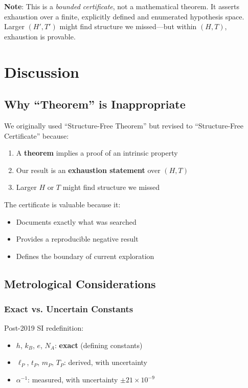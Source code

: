 \documentclass[twocolumn,showpacs,preprintnumbers,amsmath,amssymb,prl]{revtex4-2}
\begin{document}
\textbf{Note}: This is a \textit{bounded certificate}, not a mathematical theorem. It asserts exhaustion over a finite, explicitly defined and enumerated hypothesis space. Larger $(H', T')$ might find structure we missed---but within $(H, T)$, exhaustion is provable.

\section{Discussion}

\subsection{Why ``Theorem'' is Inappropriate}

We originally used ``Structure-Free Theorem'' but revised to ``Structure-Free Certificate'' because:

\begin{enumerate}
    \item A \textbf{theorem} implies a proof of an intrinsic property
    \item Our result is an \textbf{exhaustion statement} over $(H, T)$
    \item Larger $H$ or $T$ might find structure we missed
\end{enumerate}

The certificate is valuable because it:
\begin{itemize}
    \item Documents exactly what was searched
    \item Provides a reproducible negative result
    \item Defines the boundary of current exploration
\end{itemize}

\subsection{Metrological Considerations}

\subsubsection{Exact vs. Uncertain Constants}

Post-2019 SI redefinition:
\begin{itemize}
    \item $h$, $k_B$, $e$, $N_A$: \textbf{exact} (defining constants)
    \item $\ell_P$, $t_P$, $m_P$, $T_P$: derived, with uncertainty
    \item $\alpha^{-1}$: measured, with uncertainty $\pm 21 \times 10^{-9}$
\end{itemize}
\end{document}
